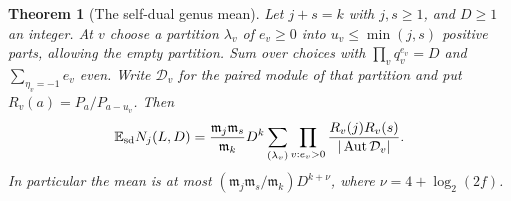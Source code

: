 \documentclass[a4paper,11pt]{article}
\newtheorem{theorem}[proposition]{Theorem}
\theoremstyle{definition}
\theoremstyle{remark}
\numberwithin{equation}{section}
\newcommand{\Aut}{\operatorname{Aut}}
\begin{document}
\begin{theorem}[The self-dual genus mean]
\label{thm:sdmean221}
Let \(j+s=k\) with \(j,s\ge1\), and \(D\ge1\) an integer.
At \(v\) choose a partition \(\lambda_v\) of \(e_v\ge0\)
into \(u_v\le\min(j,s)\) positive parts, allowing the empty
partition. Sum over choices with \(\prod_v q_v^{e_v}=D\)
and \(\sum_{\eta_v=-1} e_v\) even. Write \(\mathcal D_v\)
for the paired module of that partition and put
\(R_v(a)=P_a/P_{a-u_v}\). Then
\begin{equation}
 \mathbb E_{\rm sd} N_j(L,D)
 =\frac{\mathfrak m_j\mathfrak m_s}{\mathfrak m_k}D^k
      \sum_{(\lambda_v)}
      \prod_{v:e_v>0}\frac{R_v(j)R_v(s)}{|\Aut\mathcal D_v|}.
 \label{eq:sdmean221}
\end{equation}
In particular the mean is at most
\((\mathfrak m_j\mathfrak m_s/\mathfrak m_k)D^{k+\nu}\),
where \(\nu=4+\log_2(2f)\).
\end{theorem}
\end{document}
